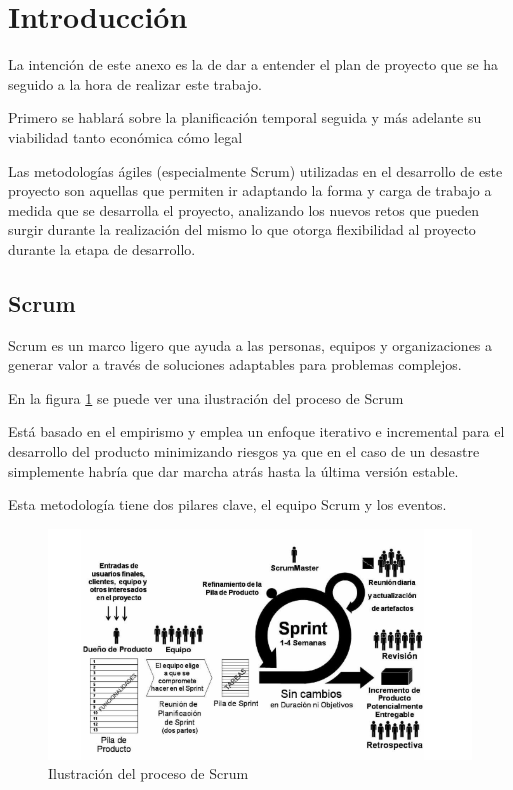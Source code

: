 
\section{Introducción}

La intención de este anexo es la de dar a entender el plan de proyecto que se ha seguido a la hora de realizar este trabajo.

Primero se hablará sobre la planificación temporal seguida y más adelante su viabilidad tanto económica cómo legal

Las metodologías ágiles (especialmente Scrum) utilizadas en el desarrollo de este proyecto son aquellas que permiten ir adaptando la forma y carga de trabajo a medida que se desarrolla el proyecto, analizando los nuevos retos que pueden surgir durante la realización del mismo lo que otorga flexibilidad al proyecto durante la etapa de desarrollo.\cite{Hayat_2019}

\subsection{Scrum}

Scrum es un marco ligero que ayuda a las personas, equipos y organizaciones a generar valor a través de soluciones adaptables para problemas complejos.

\cite{ken_schwaber_scrum_2020}

En la figura \ref{fig:scrum} se puede ver una ilustración del proceso de Scrum

Está basado en el empirismo y emplea un enfoque iterativo e incremental para el desarrollo del producto minimizando riesgos ya que en el caso de un desastre simplemente habría que dar marcha atrás hasta la última versión estable.

Esta metodología tiene dos pilares clave, el equipo Scrum y los eventos.

\begin{figure}[!h]
    \centering
    \includegraphics[width=1\textwidth]{img/Scrum.png}
    \caption{Ilustración del proceso de Scrum}
    \label{fig:scrum}
\end{figure}

